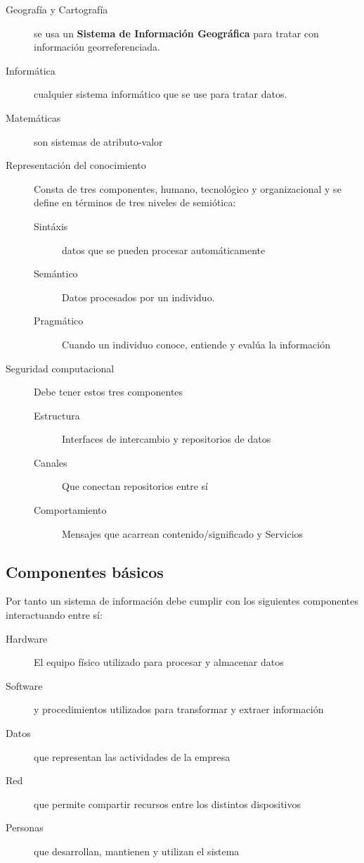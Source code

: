 \begin{description}
    \item[Geografía y Cartografía] se usa un \textbf{Sistema de Información Geográfica} para tratar con información georreferenciada.
    \item[Informática] cualquier sistema informático que se use para tratar datos.
    \item[Matemáticas] son sistemas de atributo-valor
    \item[Representación del conocimiento] Consta de tres componentes, humano, tecnológico y organizacional y se define en términos de tres niveles de semiótica:
    \begin{description}
        \item[Sintáxis] datos que se pueden procesar automáticamente
        \item[Semántico] Datos procesados por un individuo.
        \item[Pragmático] Cuando un individuo conoce, entiende y evalúa la información
    \end{description}
    \item[Seguridad computacional] Debe tener estos tres componentes
    \begin{description}
        \item[Estructura] Interfaces de intercambio y repositorios de datos
        \item[Canales] Que conectan repositorios entre sí
        \item[Comportamiento] Mensajes que acarrean contenido/significado y Servicios
    \end{description}
\end{description}



\subsection{Componentes básicos}

Por tanto un sistema de información debe cumplir con los siguientes componentes interactuando entre sí:
\begin{description}
    \item[Hardware] El equipo físico utilizado para procesar y almacenar datos
    \item[Software] y procedimientos utilizados para transformar y extraer información
    \item[Datos] que representan las actividades de la empresa
    \item[Red] que permite compartir recursos entre los distintos dispositivos
    \item[Personas] que desarrollan, mantienen y utilizan el sistema
\end{description}

